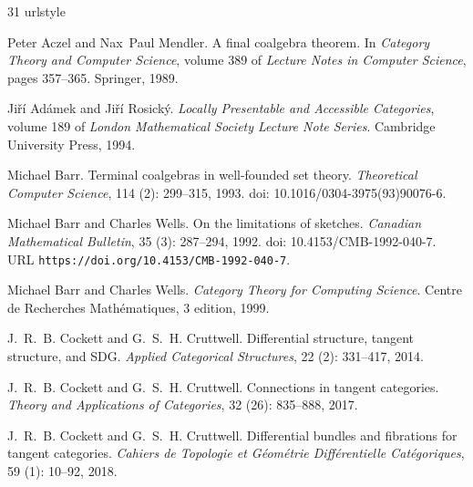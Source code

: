 \documentclass{article}
\begin{document}
\begin{thebibliography}{31}
\providecommand{\natexlab}[1]{#1}
\providecommand{\url}[1]{\texttt{#1}}
\expandafter\ifx\csname urlstyle\endcsname\relax
  \providecommand{\doi}[1]{doi: #1}\else
  \providecommand{\doi}{doi: \begingroup \urlstyle{rm}\Url}\fi

Peter Aczel and Nax~Paul Mendler.
\newblock A final coalgebra theorem.
\newblock In \emph{Category Theory and Computer Science}, volume 389 of \emph{Lecture Notes in Computer Science}, pages 357--365. Springer, 1989.

Ji{\v r}{\'i} Ad{\'a}mek and Ji{\v r}{\'i} Rosick{\'y}.
\newblock \emph{Locally Presentable and Accessible Categories}, volume 189 of \emph{London Mathematical Society Lecture Note Series}.
\newblock Cambridge University Press, 1994.

Michael Barr.
\newblock Terminal coalgebras in well-founded set theory.
\newblock \emph{Theoretical Computer Science}, 114 (2): 299--315, 1993.
\newblock \doi{10.1016/0304-3975(93)90076-6}.

Michael Barr and Charles Wells.
\newblock On the limitations of sketches.
\newblock \emph{Canadian Mathematical Bulletin}, 35 (3): 287--294, 1992.
\newblock \doi{10.4153/CMB-1992-040-7}.
\newblock URL \url{https://doi.org/10.4153/CMB-1992-040-7}.

Michael Barr and Charles Wells.
\newblock \emph{Category Theory for Computing Science}.
\newblock Centre de Recherches Math{\'e}matiques, 3 edition, 1999.

J.~R.~B. Cockett and G.~S.~H. Cruttwell.
\newblock Differential structure, tangent structure, and {SDG}.
\newblock \emph{Applied Categorical Structures}, 22 (2): 331--417, 2014.

J.~R.~B. Cockett and G.~S.~H. Cruttwell.
\newblock Connections in tangent categories.
\newblock \emph{Theory and Applications of Categories}, 32 (26): 835--888, 2017.

J.~R.~B. Cockett and G.~S.~H. Cruttwell.
\newblock Differential bundles and fibrations for tangent categories.
\newblock \emph{Cahiers de Topologie et G{\'e}om{\'e}trie Diff{\'e}rentielle Cat{\'e}goriques}, 59 (1): 10--92, 2018.


\end{thebibliography}
\end{document}

